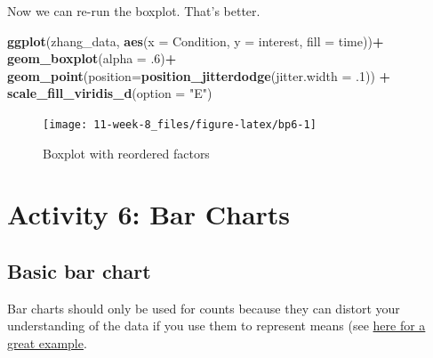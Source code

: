 \documentclass[]{book}
\newenvironment{Shaded}{\begin{snugshade}}{\end{snugshade}}
\newcommand{\DataTypeTok}[1]{\textcolor[rgb]{0.13,0.29,0.53}{#1}}
\newcommand{\FloatTok}[1]{\textcolor[rgb]{0.00,0.00,0.81}{#1}}
\newcommand{\KeywordTok}[1]{\textcolor[rgb]{0.13,0.29,0.53}{\textbf{#1}}}
\newcommand{\NormalTok}[1]{#1}
\newcommand{\OperatorTok}[1]{\textcolor[rgb]{0.81,0.36,0.00}{\textbf{#1}}}
\newcommand{\StringTok}[1]{\textcolor[rgb]{0.31,0.60,0.02}{#1}}
\begin{document}
\begin{Shaded}
\end{Shaded}

Now we can re-run the boxplot. That's better.

\begin{Shaded}
\begin{Highlighting}[]
\KeywordTok{ggplot}\NormalTok{(zhang_data, }\KeywordTok{aes}\NormalTok{(}\DataTypeTok{x =}\NormalTok{ Condition, }\DataTypeTok{y =}\NormalTok{ interest, }\DataTypeTok{fill =}\NormalTok{ time))}\OperatorTok{+}
\StringTok{  }\KeywordTok{geom_boxplot}\NormalTok{(}\DataTypeTok{alpha =} \FloatTok{.6}\NormalTok{)}\OperatorTok{+}
\StringTok{  }\KeywordTok{geom_point}\NormalTok{(}\DataTypeTok{position=}\KeywordTok{position_jitterdodge}\NormalTok{(}\DataTypeTok{jitter.width =} \FloatTok{.1}\NormalTok{)) }\OperatorTok{+}
\StringTok{  }\KeywordTok{scale_fill_viridis_d}\NormalTok{(}\DataTypeTok{option =} \StringTok{"E"}\NormalTok{)}
\end{Highlighting}
\end{Shaded}

\begin{figure}

{\centering \texttt{[image: 11-week-8\_files/figure-latex/bp6-1]} 

}

\caption{Boxplot with reordered factors}\label{fig:bp6}
\end{figure}

\hypertarget{activity-6-bar-charts}{%
\section{Activity 6: Bar Charts}\label{activity-6-bar-charts}}

\hypertarget{basic-bar-chart}{%
\subsection{Basic bar chart}\label{basic-bar-chart}}

Bar charts should only be used for counts because they can distort your understanding of the data if you use them to represent means (see \href{https://www.autodeskresearch.com/publications/samestats}{here for a great example}.
\end{document}
